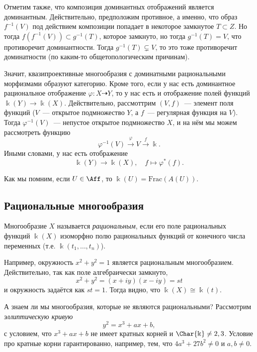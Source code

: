	 Отметим также, что композиция доминантных отображений является доминантным. Действительно, предположим противное, а именно, что образ $f^{-1}(V)$ под действием композиции попадает в некоторое замкнутое $T \subset Z$. Но тогда $f(f^{-1}(V)) \subset g^{-1}(T)$, которое замкнуто, но тогда $g^{-1}(T) = V$, что противоречит доминантности. Тогда $g^{-1}(T) \subsetneq V$, то это тоже противоречит  доминатности (по каким-то общетопологическим причинам). 

	 Значит, квазипроективные многообразия с доминатными рациональными морфизмами образуют категорию. Кроме того, если у нас есть доминантное рациональное отображение $\varphi\colon X \dashrightarrow Y$, то у нас есть и отображение полей функций $\Bbbk(Y) \to \Bbbk(X)$. Действительно, рассмоттрим $(V, f)$~--- элемент поля функций ($V$~--- открытое подмножество $Y$, а $f$~--- регулярная функция на $V$). Тогда $\varphi^{-1}(V)$~--- непустое открытое подмножество $X$, и на нём мы можем рассмотреть функцию 
	 \[
	 	\varphi^{-1}(V) \xrightarrow{\varphi} V \xrightarrow{f} \Bbbk.
	 \]
	 Иными словами, у нас есть отображение 
	 \[
	 	\Bbbk(Y) \to \Bbbk(X), \quad f \mapsto \varphi^{*}(f).
	 \]

	 Как мы помним, если $U \in \Aff$, то $\Bbbk(U) = \mathrm{Frac}(A(U))$. 

	 \subsection{Рациональные многообразия}

	 \begin{definition} 
	 	Многообразие $X$ называется \emph{рациональным}, если его поле рациональных функций $\Bbbk(X)$ изоморфно полю рациональных функций от конечного числа переменных (т.е. $\Bbbk(t_1, \ldots, t_n)$).
	 \end{definition}

	 \begin{example}
	 	Например, окружность $x^2 + y^2 = 1$ является рациональным многообразием. Действительно, так как поле алгебраически замкнуто, 
	 	\[
	 		x^2 + y^2 = (x + iy)(x - iy) = st
	 	\]
	 	и окружность задаётся как $st = 1$. Тогда видно, что $\Bbbk(X) \cong \Bbbk(t)$.
	 \end{example}

	 А знаем ли мы многообразия, которые не являются рациональными? Рассмотрим \emph{эллиптическую кривую}
	 \[
	 	y^2 = x^3 + ax + b,
	 \]
	 с условием, что $x^3 + ax + b$ не имеет кратных корней и $\Char{\Bbbk} \neq 2, 3$. Условие про кратные корни гарантированно, например, тем, что $4a^3 + 27b^2 \neq 0$ и $a, b \neq 0$.

